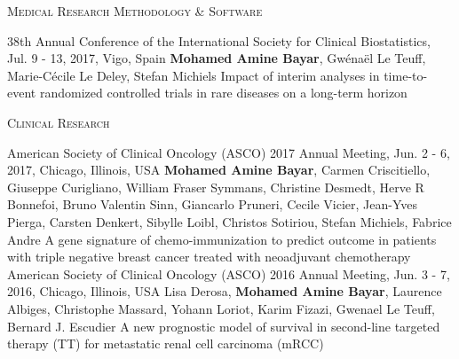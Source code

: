 \vspace*{-1em}
\vspace*{.5em}
\textsc{{\color{accentcolor} Medical Research Methodology \& Software}}
\vspace*{-.5em}
\begin{projects}
\paper
{38th Annual Conference of the International Society for Clinical Biostatistics, Jul. 9 - 13, 2017, Vigo, Spain}
{}
{\textbf{Mohamed Amine Bayar}, Gw\'{e}na\"{e}l Le Teuff, Marie-C\'{e}cile Le Deley, Stefan Michiels}
{Impact of interim analyses in time-to-event randomized controlled trials in rare diseases on a long-term horizon}
\end{projects}
\vspace*{-2em}
\textsc{{\color{accentcolor} Clinical Research}}
\vspace*{-.5em}
\begin{projects}
\paper
{American Society of Clinical Oncology (ASCO) 2017 Annual Meeting, Jun. 2 - 6, 2017, Chicago, Illinois, USA}
{}
{\textbf{Mohamed Amine Bayar}, Carmen Criscitiello, Giuseppe Curigliano, William Fraser Symmans, Christine Desmedt, Herve R Bonnefoi, Bruno Valentin Sinn, Giancarlo Pruneri, Cecile Vicier, Jean-Yves Pierga, Carsten Denkert, Sibylle Loibl, Christos Sotiriou, Stefan Michiels, Fabrice Andre}
{A gene signature of chemo-immunization to predict outcome in patients with triple negative breast cancer treated with neoadjuvant chemotherapy}
\paper
{American Society of Clinical Oncology (ASCO) 2016 Annual Meeting, Jun. 3 - 7, 2016, Chicago, Illinois, USA}
{}
{Lisa Derosa, \textbf{Mohamed Amine Bayar}, Laurence Albiges, Christophe Massard, Yohann Loriot, Karim Fizazi, Gwenael Le Teuff, Bernard J. Escudier}
{A new prognostic model of survival in second-line targeted therapy (TT) for metastatic renal cell carcinoma (mRCC)}
\end{projects}